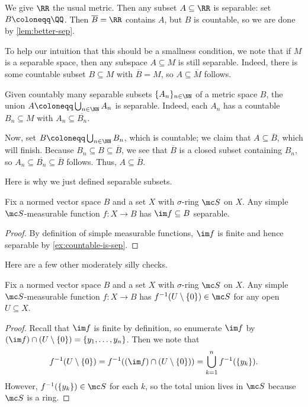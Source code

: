 \documentclass[../notes.tex]{subfiles}
\begin{document}
\begin{example} \label{ex:all-sep-in-r}
	We give $\RR$ the usual metric. Then any subset $A\subseteq\RR$ is separable: set $B\coloneqq\QQ$. Then $\overline B=\RR$ contains $A$, but $B$ is countable, so we are done by \autoref{lem:better-sep}.
\end{example}
\begin{remark} \label{rem:subspace-of-sep-is-sep}
	To help our intuition that this should be a smallness condition, we note that if $M$ is a separable space, then any subspace $A\subseteq M$ is still separable. Indeed, there is some countable subset $B\subseteq M$ with $\overline B=M$, so $A\subseteq\overline M$ follows.
\end{remark}
\begin{example} \label{ex:union-of-seps-is-sep}
	Given countably many separable subsets $\{A_n\}_{n\in\NN}$ of a metric space $B$, the union $A\coloneqq\bigcup_{n\in\NN}A_n$ is separable. Indeed, each $A_n$ has a countable $B_n\subseteq M$ with $A_n\subseteq\overline{B_n}$.

	Now, set $B\coloneqq\bigcup_{n\in\NN}B_n$, which is countable; we claim that $A\subseteq\overline B$, which will finish. Because $B_n\subseteq B\subseteq\overline B$, we see that $\overline B$ is a closed subset containing $B_n$, so $A_n\subseteq\overline{B_n}\subseteq\overline B$ follows. Thus, $A\subseteq\overline B$.
\end{example}
Here is why we just defined separable subsets.
\begin{lemma} \label{lem:simple-has-sep-image}
	Fix a normed vector space $B$ and a set $X$ with $\sigma$-ring $\mc S$ on $X$. Any simple $\mc S$-measurable function $f\colon X\to B$ has $\im f\subseteq B$ separable.
\end{lemma}
\begin{proof}
	By definition of simple measurable functions, $\im f$ is finite and hence separable by \autoref{ex:countable-is-sep}.
\end{proof}
Here are a few other moderately silly checks.
\begin{lemma} \label{lem:simple-measurable-pre-image}
	Fix a normed vector space $B$ and a set $X$ with $\sigma$-ring $\mc S$ on $X$. Any simple $\mc S$-measurable function $f\colon X\to B$ has $f^{-1}(U\setminus\{0\})\in\mc S$ for any open $U\subseteq X$.
\end{lemma}
\begin{proof}
	Recall that $\im f$ is finite by definition, so enumerate $\im f$ by $(\im f)\cap(U\setminus\{0\})=\{y_1,\ldots,y_n\}$. Then we note that
	\[f^{-1}(U\setminus\{0\})=f^{-1}((\im f)\cap(U\setminus\{0\}))=\bigcup_{k=1}^nf^{-1}(\{y_k\}).\]
	However, $f^{-1}(\{y_k\})\in\mc S$ for each $k$, so the total union lives in $\mc S$ because $\mc S$ is a ring.
\end{proof}
\end{document}
